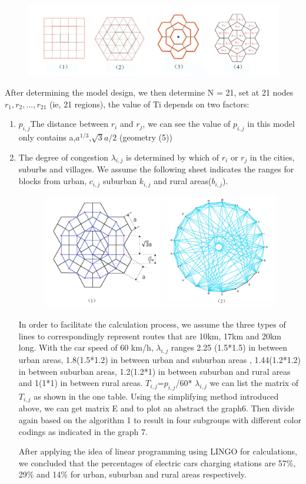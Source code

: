 \documentclass{mcmthesis}
\begin{document}
 \begin{figure}[htbp]
	\centering
	\includegraphics[width=15cm]{img/img710.jpg}\\
\end{figure}

After determining the model design, we then determine N = 21, set at 21 nodes $r_1, r_2, ..., r_{21}$ (ie, 21 regions), the value of Ti depends on two factors: 
\begin{enumerate}[1.]
 \item $p_{i,j}$The distance between $r_i$ and $r_j$, we can see the value of $p_{i,j}$ in this model only contains a,${a^{1/3}}$,$\sqrt 3 a/2$ (geometry (5))
 \item The degree of congestion $\lambda_{i,j}$ is determined by which of $r_i$ or $r_j$ in the cities, suburbs and villages.
We assume the following sheet indicates the ranges for blocks from urban, $c_{i,j}$ suburban $k_{i,j}$ and rural areas($b_{i,j}$). 
 \begin{figure}[htbp]
	\centering
	\includegraphics[width=12cm]{img/img12.jpg}\\
\end{figure}
In order to facilitate the calculation process, we assume the three types of lines to correspondingly represent routes that are 10km, 17km and 20km long. With the car speed of 60 km/h, $λ_{i,j}$ ranges 2.25 (1.5*1.5) in between urban areas, 1.8(1.5*1.2) in between urban and suburban areas , 1.44(1.2*1.2) in between suburban areas, 1.2(1.2*1) in between suburban and rural areas and 1(1*1) in between rural areas.
$T_{i,j}$=$p_{i,j}$/60* $λ_{i,j}$
we can list the matrix of $T_{i,j}$ as shown in the one table. Using the simplifying method introduced above, we can get matrix E  and to plot an abstract the graph6. Then divide again based on the algorithm 1  to result in four subgroups with different color codings as indicated in the graph 7.
\par
After applying the idea of linear programming using LINGO for calculations, we concluded that the percentages of electric cars charging stations are 57\%, 29\% and 14\% for urban, suburban and rural areas respectively.
\end{enumerate}
\end{document}
